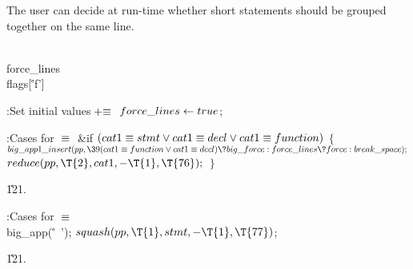The user can decide at run-time whether short statements should be
grouped together on the same line.

\Y\B\4\D\\{force\_lines}\5
\\{flags}[\.{'f'}]\par
\Y\B\4:Set initial values\X${}\mathrel+\equiv{}$\6
$\\{force\_lines}\leftarrow\\{true}{}$;\par
\fi

\B{}:Cases for \X${}\equiv{}$\6
\&{if} ${}(\\{cat1}\equiv\\{stmt}\lor\\{cat1}\equiv\\{decl}\lor\\{cat1}\equiv\\{function}){}$\5
${}\{{}$\1\6
${}\\{big\_app1\_insert}(\\{pp},\39(\\{cat1}\E\\{function}\V\\{cat1}\E\\{decl})%
\?\\{big\_force}:\\{force\_lines}\?\\{force}:\\{break\_space});{}$\6
${}\\{reduce}(\\{pp},\39\T{2},\39\\{cat1},\39{-}\T{1},\39\T{76});{}$\6
\4${}\}{}$\2\par
\U121.\fi

\B{}:Cases for \X${}\equiv{}$\6
\\{big\_app}(\.{'\ '});\6
${}\\{squash}(\\{pp},\39\T{1},\39\\{stmt},\39{-}\T{1},\39\T{77}){}$;\par
\U121.\fi

